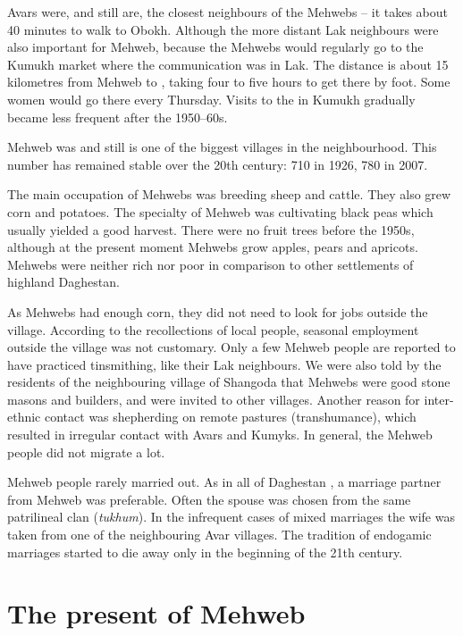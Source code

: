 \documentclass[output=paper]{langsci/langscibook}
\begin{document}
\pagebreak

Avars were, and still are, the closest neighbours of the Mehwebs – it
takes about 40 minutes to walk to Obokh. Although the more distant Lak
neighbours were also important for Mehweb, because the Mehwebs would regularly
go to the Kumukh market where the communication was in Lak. The distance is about 
15 kilometres from Mehweb to , taking four to five
hours to get there by foot. Some women would go there every
Thursday. Visits to the  in Kumukh gradually became less frequent
after the 1950–60s.

Mehweb was and still is one of the biggest villages in the
neighbourhood. 
This number has remained stable over the 20th century: 710 in 1926, 780
in 2007.

The main occupation of Mehwebs was breeding sheep and cattle. They also
grew corn and potatoes. The specialty of Mehweb was cultivating black peas which
usually yielded a good harvest. There were no fruit trees before the 1950s,
although at the present moment Mehwebs grow apples, pears and apricots.
Mehwebs were neither rich nor poor in comparison to other settlements of
highland Daghestan.

As Mehwebs had enough corn, they did not need to look for jobs outside
the village. According to the recollections of local people, seasonal
employment outside the village was not customary. Only a few Mehweb
people are reported to have practiced tinsmithing, like their Lak
neighbours. We were also told by the residents of the neighbouring
village of Shangoda that Mehwebs were good stone masons and builders,
and were invited to other villages. Another reason for inter-ethnic
contact was shepherding on remote pastures (transhumance), which
resulted in irregular contact with Avars and Kumyks. In general, the Mehweb
people did not migrate a lot.

Mehweb people rarely married out. As in all of Daghestan \citep{comrie2008,
wixman1980}, a marriage partner from Mehweb was preferable. Often the
spouse was chosen from the same patrilineal clan (\emph{tukhum}). In the
infrequent cases of mixed marriages the wife was taken from one of the
neighbouring Avar villages. The tradition of endogamic marriages started
to die away only in the beginning of the 21th century.

\section{The present of Mehweb}\label{the-present-of-mehweb}
\end{document}
